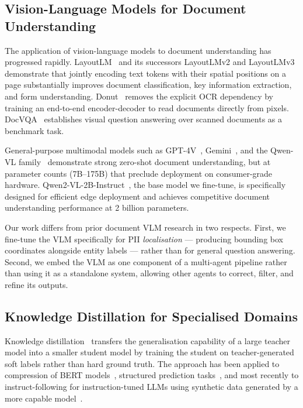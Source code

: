 \subsection{Vision-Language Models for Document
            Understanding}

The application of vision-language models to document
understanding has progressed rapidly.
LayoutLM~\cite{xu2020layoutlm} and its successors
LayoutLMv2 and LayoutLMv3~\cite{xu2021layoutlmv2,
huang2022layoutlmv3} demonstrate that jointly encoding
text tokens with their spatial positions on a page
substantially improves document classification, key
information extraction, and form understanding.
Donut~\cite{kim2022donut} removes the explicit OCR
dependency by training an end-to-end encoder-decoder
to read documents directly from pixels.
DocVQA~\cite{mathew2021docvqa} establishes visual
question answering over scanned documents as a
benchmark task.

General-purpose multimodal models such as
GPT-4V~\cite{openai2023gpt4v},
Gemini~\cite{team2023gemini}, and the Qwen-VL
family~\cite{bai2023qwenvl} demonstrate strong
zero-shot document understanding,
but at parameter counts (7B--175B) that preclude
deployment on consumer-grade hardware.
Qwen2-VL-2B-Instruct~\cite{wang2024qwen2vl}, the base
model we fine-tune, is specifically designed for
efficient edge deployment and achieves competitive
document understanding performance at 2 billion
parameters.

Our work differs from prior document VLM research in
two respects.
First, we fine-tune the VLM specifically for PII
\emph{localisation} --- producing bounding box coordinates
alongside entity labels --- rather than for general
question answering.
Second, we embed the VLM as one component of a
multi-agent pipeline rather than using it as a
standalone system, allowing other agents to correct,
filter, and refine its outputs.

\subsection{Knowledge Distillation for Specialised Domains}

Knowledge distillation~\cite{hinton2015distilling}
transfers the generalisation capability of a large
teacher model into a smaller student model by training
the student on teacher-generated soft labels rather
than hard ground truth.
The approach has been applied to compression of BERT
models~\cite{sanh2019distilbert}, structured prediction
tasks~\cite{li2022explaining}, and most recently to
instruct-following for instruction-tuned LLMs using
synthetic data generated by a more capable
model~\cite{taori2023alpaca, wang2023selfinstruct}.

